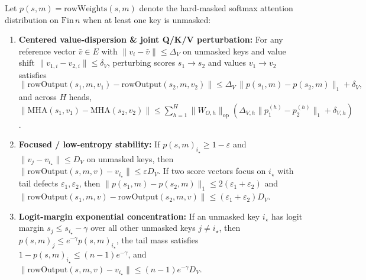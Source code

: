 \begin{lemma}\label{lem:attention_logit_stability}
\leanok
{}
Let $p(s, m) = \mathrm{rowWeights}(s, m)$ denote the hard-masked softmax attention distribution on $\mathrm{Fin}\,n$ when at least one key is unmasked:
\begin{enumerate}
\item \textbf{Centered value-dispersion & joint Q/K/V perturbation:} For any reference vector $\bar{v}\in E$ with $\|v_i - \bar{v}\|\le \Delta_V$ on unmasked keys and value shift $\|v_{1,i} - v_{2,i}\|\le \delta_V$, perturbing scores $s_1\to s_2$ and values $v_1\to v_2$ satisfies
\[
\bigl\|\mathrm{rowOutput}(s_1, m, v_1) - \mathrm{rowOutput}(s_2, m, v_2)\bigr\| \le \Delta_V\,\|p(s_1,m) - p(s_2,m)\|_1 + \delta_V,
\]
and across $H$ heads, $\|\mathrm{MHA}(s_1, v_1) - \mathrm{MHA}(s_2, v_2)\| \le \sum_{h=1}^H \|W_{O,h}\|_{\mathrm{op}}(\Delta_{V,h}\|p_1^{(h)} - p_2^{(h)}\|_1 + \delta_{V,h})$.
\item \textbf{Focused / low-entropy stability:} If $p(s,m)_{i_\star} \ge 1 - \varepsilon$ and $\|v_j - v_{i_\star}\|\le D_V$ on unmasked keys, then $\|\mathrm{rowOutput}(s,m,v) - v_{i_\star}\| \le \varepsilon D_V$. If two score vectors focus on $i_\star$ with tail defects $\varepsilon_1, \varepsilon_2$, then $\|p(s_1,m) - p(s_2,m)\|_1 \le 2(\varepsilon_1 + \varepsilon_2)$ and $\|\mathrm{rowOutput}(s_1,m,v) - \mathrm{rowOutput}(s_2,m,v)\| \le (\varepsilon_1 + \varepsilon_2)D_V$.
\item \textbf{Logit-margin exponential concentration:} If an unmasked key $i_\star$ has logit margin $s_j \le s_{i_\star} - \gamma$ over all other unmasked keys $j\ne i_\star$, then $p(s,m)_j \le e^{-\gamma} p(s,m)_{i_\star}$, the tail mass satisfies $1 - p(s,m)_{i_\star} \le (n-1)e^{-\gamma}$, and $\|\mathrm{rowOutput}(s,m,v) - v_{i_\star}\| \le (n-1)e^{-\gamma} D_V$.
\end{enumerate}
\end{lemma}
